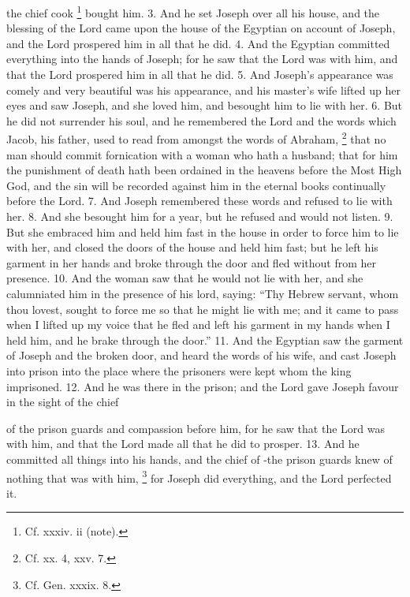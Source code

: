 the chief cook \footnote{Cf. xxxiv. ii (note).} bought him. 3. And he set Joseph over all his house, and the blessing of the Lord came upon the house of the Egyptian on account of Joseph, and the Lord prospered him in all that he did. 4. And the Egyptian committed everything into the hands of Joseph; for he saw that the Lord was with him, and that the Lord prospered him in all that he did. 5. And Joseph's appearance was comely and very beautiful was his appearance, and his master's wife lifted up her eyes and saw Joseph, and she loved him, and besought him to lie with her. 6. But he did not surrender his soul, and he remembered the Lord and the words which Jacob, his father, used to read from amongst the words of Abraham, \footnote{Cf. xx. 4, xxv. 7.} that no man should commit fornication with a woman who hath a husband; that for him the punishment of death hath been ordained in the heavens before the Most High God, and the sin will be recorded against him in the eternal books continually before the Lord. 7. And Joseph remembered these words and refused to lie with her. 8. And she besought him for a year, but he refused and would not listen. 9. But she embraced him and held him fast in the house in order to force him to lie with her, and closed the doors of the house and held him fast; but he left his garment in her hands and broke through the door and fled without from her presence. 10. And the woman saw that he would not lie with her, and she calumniated him in the presence of his lord, saying: ``Thy Hebrew servant, whom thou lovest, sought to force me so that he might lie with me; and it came to pass when I lifted up my voice that he fled and left his garment in my hands when I held him, and he brake through the door.'' 11. And the Egyptian saw the garment of Joseph and the broken door, and heard the words of his wife, and cast Joseph into prison into the place where the prisoners were kept whom the king imprisoned. 12. And he was there in the prison; and the Lord gave Joseph favour in the sight of the chief

of the prison guards and compassion before him, for he saw that the Lord was with him, and that the Lord made all that he did to prosper. 13. And he committed all things into his hands, and the chief of -the prison guards knew of nothing that was with him, \footnote{Cf. Gen. xxxix. 8.} for Joseph did everything, and the Lord perfected it.


